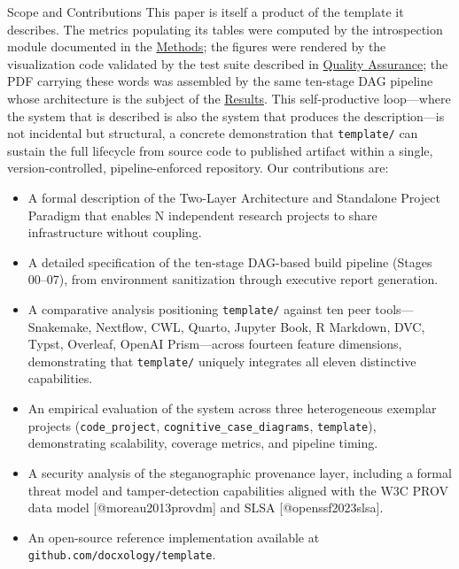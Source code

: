 \documentclass[
  ignorenonframetext,
]{beamer}
\providecommand{\tightlist}{%
  \setlength{\itemsep}{0pt}\setlength{\parskip}{0pt}}
\begin{document}
\begin{frame}[fragile]{Scope and Contributions}
\protect{}\label{scope-and-contributions}
This paper is itself a product of the template it describes. The metrics
populating its tables were computed by the introspection module
documented in the \href{03a_architecture.md\#methods}{Methods}; the
figures were rendered by the visualization code validated by the test
suite described in \href{03e_quality.md\#quality-assurance}{Quality
Assurance}; the PDF carrying these words was assembled by the same
ten-stage DAG pipeline whose architecture is the subject of the
\href{04_results.md\#results}{Results}. This self-productive
loop---where the system that is described is also the system that
produces the description---is not incidental but structural, a concrete
demonstration that \texttt{template/} can sustain the full lifecycle
from source code to published artifact within a single,
version-controlled, pipeline-enforced repository. Our contributions are:

\begin{itemize}
\tightlist
\item
  A formal description of the Two-Layer Architecture and Standalone
  Project Paradigm that enables N independent research projects to share
  infrastructure without coupling.
\item
  A detailed specification of the ten-stage DAG-based build pipeline
  (Stages 00--07), from environment sanitization through executive
  report generation.
\item
  A comparative analysis positioning \texttt{template/} against ten peer
  tools---Snakemake, Nextflow, CWL, Quarto, Jupyter Book, R Markdown,
  DVC, Typst, Overleaf, OpenAI Prism---across fourteen feature
  dimensions, demonstrating that \texttt{template/} uniquely integrates
  all eleven distinctive capabilities.
\item
  An empirical evaluation of the system across three heterogeneous
  exemplar projects (\texttt{code\_project},
  \texttt{cognitive\_case\_diagrams}, \texttt{template}), demonstrating
  scalability, coverage metrics, and pipeline timing.
\item
  A security analysis of the steganographic provenance layer, including
  a formal threat model and tamper-detection capabilities aligned with
  the W3C PROV data model {[}@moreau2013provdm{]} and SLSA
  {[}@openssf2023slsa{]}.
\item
  An open-source reference implementation available at
  \texttt{github.com/docxology/template}.
\end{itemize}
\end{frame}
\end{document}
